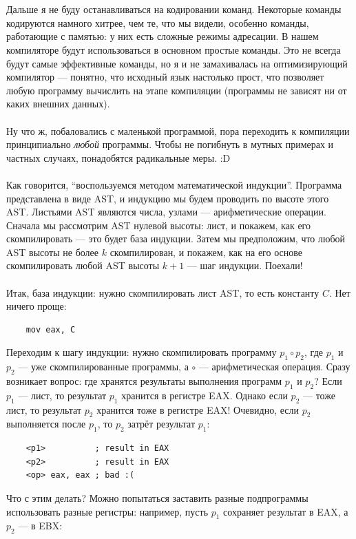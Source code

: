 \documentclass[11pt]{book}
\begin{document}
\\ \\
Дальше я не буду останавливаться на кодировании команд.
Некоторые команды кодируются намного хитрее, чем те, что мы видели,
особенно команды, работающие с памятью: у них есть сложные режимы адресации.
В нашем компиляторе будут использоваться в основном простые команды.
Это не всегда будут самые эффективные команды, но я и не замахивалась на оптимизирующий компилятор ---
понятно, что исходный язык настолько прост, что позволяет любую программу вычислить на этапе компиляции
(программы не зависят ни от каких внешних данных).
\\ \\
Ну что ж, побаловались с маленькой программой, пора переходить к компиляции принципиально \emph{любой} программы.
Чтобы не погибнуть в мутных примерах и частных случаях, понадобятся радикальные меры. :D
\\ \\
Как говорится, ``воспользуемся методом математической индукции''.
Программа представлена в виде AST, и индукцию мы будем проводить по высоте этого AST.
Листьями AST являются числа, узлами --- арифметические операции.
Сначала мы рассмотрим AST нулевой высоты: лист, и покажем, как его скомпилировать --- это будет база индукции.
Затем мы предположим, что любой AST высоты не более $k$ скомпилирован, и покажем, как на его основе скомпилировать любой AST высоты $k + 1$ --- шаг индукции.
Поехали!
\\ \\
Итак, база индукции: нужно скомпилировать лист AST, то есть константу $C$.
Нет ничего проще:
\begin{verbatim}
    mov eax, С
\end{verbatim}
Переходим к шагу индукции: нужно скомпилировать программу $p_1 \circ p_2$,
где $p_1$ и $p_2$ --- уже скомпилированные программы, а $\circ$ --- арифметическая операция.
Сразу возникает вопрос: где хранятся результаты выполнения программ $p_1$ и $p_2$?
Если $p_1$ --- лист, то результат $p_1$ хранится в регистре EAX.
Однако если $p_2$ --- тоже лист, то результат $p_2$ хранится тоже в регистре EAX!
Очевидно, если $p_2$ выполняется после $p_1$, то $p_2$ затрёт результат $p_1$:
\begin{verbatim}
    <p1>          ; result in EAX
    <p2>          ; result in EAX
    <op> eax, eax ; bad :(
\end{verbatim}
Что с этим делать?
Можно попытаться заставить разные подпрограммы использовать разные регистры:
например, пусть $p_1$ сохраняет результат в EAX, а $p_2$ --- в EBX:
\end{document}
